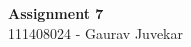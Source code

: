 \documentclass[main.tex]{subfiles}
\begin{document}
\begin{titlepage}

\begin{center}
  \LARGE{\bf{Assignment 7\\}}
  \horrule{0.4pt}
  111408024 - Gaurav Juvekar \\
\end{center}
\horrule{0.4pt}
\end{titlepage}
\end{document}
